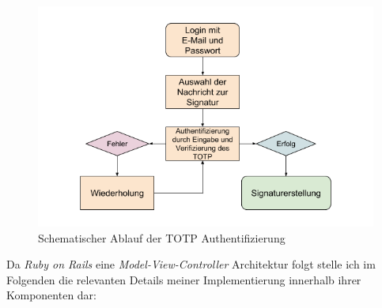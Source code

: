 \documentclass[11pt,a4paper,ngerman]{scrreprt}
\begin{document}
\begin{figure}[htbp]
    \centering
        \includegraphics[width=\textwidth]{Abbildungen/Ablauf_TOTP}
    \caption{Schematischer Ablauf der TOTP Authentifizierung}
    \label{fig:totp}
\end{figure}
\clearpage

Da \textit{Ruby on Rails} eine \textit{Model-View-Controller} Architektur folgt stelle ich im Folgenden die relevanten Details meiner Implementierung innerhalb ihrer Komponenten dar:
\end{document}
